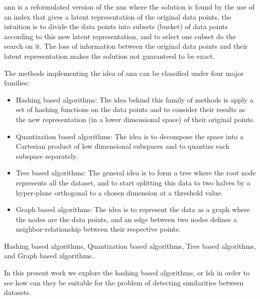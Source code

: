 \Acrfull{ann} is a reformulated version of the \Acrlong{nns} where the solution
is found by the use of an index that gives a latent representation of the
original data points, the intuition is to divide the data points into subsets
(\gls{bucket}) of data points according to this new latent representation, and to
select one subset do the search on it. The loss of information between the
original data points and their latent representation makes the solution not
guaranteed to be exact.

The methods implementing the idea of \acrshort{ann} can be classified under four
major families:
\begin{itemize}
      \item Hashing based algorithms: The idea behind this family of methods is
            apply a set of hashing functions on the data points and to consider
            their results as the new representation (in a lower dimensional space)
            of their original points.
      \item Quantization based algorithms: The idea is to decompose the space
            into a Cartesian product of low dimensional subspaces and to quantize each
            subspace separately. \citep{jegou_pqfnns_2011}
      \item Tree based algorithms: The general idea is to form a tree where the
            root node represents all the dataset, and to start splitting this data to
            two halves by a hyper-plane orthogonal to a chosen dimension at a threshold
            value. \citep{silpanan_2008}
      \item Graph based algorithms: The idea is to represent the data as a graph
            where the nodes are the data points, and an edge between two nodes
            defines a neighbor-relationship between their respective points.
            \citep{ann_mengzaho_2021}
\end{itemize}

Hashing based algorithms, Quantization based algorithms, Tree
based algorithms, and Graph based algorithms.\citep{ann_mengzaho_2021}.

In this present work we explore the hashing based algorithms, or \acrfull{lsh}
in order to see how can they be suitable for the problem of detecting
similarities between datasets.

